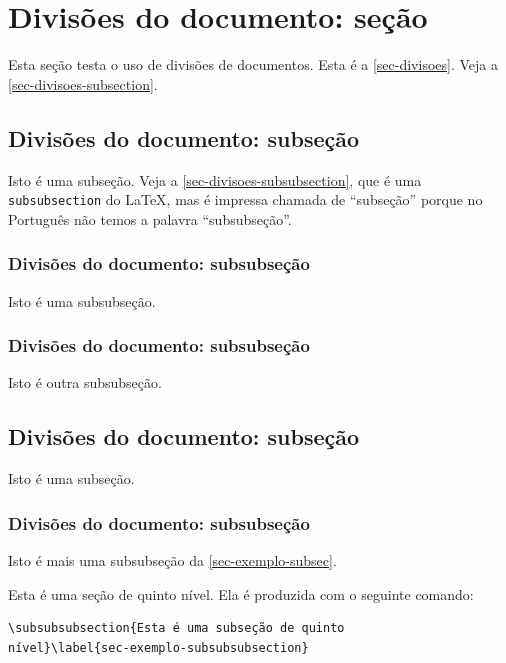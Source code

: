 \section{Divisões do documento: seção}\label{sec-divisoes}

Esta seção testa o uso de divisões de documentos. Esta é a \autoref{sec-divisoes}. Veja a \autoref{sec-divisoes-subsection}.

\subsection{Divisões do documento: subseção}\label{sec-divisoes-subsection}

Isto é uma subseção. Veja a \autoref{sec-divisoes-subsubsection}, que é uma \texttt{subsubsection} do \LaTeX, mas é impressa chamada de ``subseção'' porque no Português não temos a palavra ``subsubseção''.

\subsubsection{Divisões do documento: subsubseção}
\label{sec-divisoes-subsubsection}

Isto é uma subsubseção.

\subsubsection{Divisões do documento: subsubseção}

Isto é outra subsubseção.

\subsection{Divisões do documento: subseção}\label{sec-exemplo-subsec}

Isto é uma subseção.

\subsubsection{Divisões do documento: subsubseção}

Isto é mais uma subsubseção da \autoref{sec-exemplo-subsec}.

\label{sec-exemplo-subsubsubsection}

Esta é uma seção de quinto nível. Ela é produzida com o seguinte comando:

\begin{verbatim}
\subsubsubsection{Esta é uma subseção de quinto
nível}\label{sec-exemplo-subsubsubsection}
\end{verbatim}

